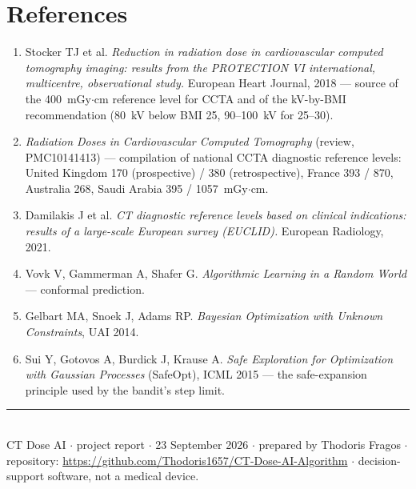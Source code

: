 \documentclass[10pt,a4paper]{article}
\newcommand{\mgycm}{mGy$\cdot$cm}
\begin{document}
\section{References}
\begin{enumerate}\footnotesize
\item Stocker TJ et al. \textit{Reduction in radiation dose in cardiovascular computed tomography imaging: results
from the PROTECTION VI international, multicentre, observational study.} European Heart Journal, 2018 --- source of
the 400~\mgycm{} reference level for CCTA and of the kV-by-BMI recommendation (80~kV below BMI 25, 90--100~kV for
25--30).
\item \textit{Radiation Doses in Cardiovascular Computed Tomography} (review, PMC10141413) --- compilation of
national CCTA diagnostic reference levels: United Kingdom 170 (prospective) / 380 (retrospective), France 393 /
870, Australia 268, Saudi Arabia 395 / 1057~\mgycm.
\item Damilakis J et al. \textit{CT diagnostic reference levels based on clinical indications: results of a
large-scale European survey (EUCLID).} European Radiology, 2021.
\item Vovk V, Gammerman A, Shafer G. \textit{Algorithmic Learning in a Random World} --- conformal prediction.
\item Gelbart MA, Snoek J, Adams RP. \textit{Bayesian Optimization with Unknown Constraints}, UAI 2014.
\item Sui Y, Gotovos A, Burdick J, Krause A. \textit{Safe Exploration for Optimization with Gaussian Processes}
(SafeOpt), ICML 2015 --- the safe-expansion principle used by the bandit's step limit.
\end{enumerate}

\vfill
{\footnotesize\color{ctink2}\rule{\linewidth}{0.4pt}\\[2pt]
CT Dose AI $\cdot$ project report $\cdot$ 23 September 2026 $\cdot$ prepared by Thodoris Fragos $\cdot$
repository: \url{https://github.com/Thodoris1657/CT-Dose-AI-Algorithm} $\cdot$ decision-support software, not a
medical device.\par}
\end{document}
